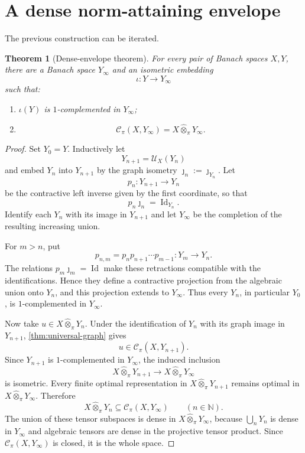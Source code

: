 \documentclass[11pt]{article}
\newtheorem{theorem}{Theorem}[section]
\theoremstyle{definition}
\theoremstyle{remark}
\newcommand{\N}{\mathbb N}
\newcommand{\whot}{\widehat\otimes_\pi}
\newcommand{\id}{\operatorname{Id}}
\newcommand{\Cpi}{\mathscr C_\pi}
\newcommand{\U}{\mathcal U}
\begin{document}
\section{A dense norm-attaining envelope}

The previous construction can be iterated.

\begin{theorem}[Dense-envelope theorem]\label{thm:envelope}
For every pair of Banach spaces $X,Y$, there are a Banach space $Y_\infty$ and an isometric embedding
\[
 \iota:Y\longrightarrow Y_\infty
\]
such that:
\begin{enumerate}[label=\textup{(\roman*)}]
\item $\iota(Y)$ is $1$-complemented in $Y_\infty$;
\item
\[
 \Cpi(X,Y_\infty)=X\whot Y_\infty.
\]
\end{enumerate}
\end{theorem}

\begin{proof}
Set $Y_0=Y$.  Inductively let
\[
 Y_{n+1}=\U_X(Y_n)
\]
and embed $Y_n$ into $Y_{n+1}$ by the graph isometry $\jmath_n:=\jmath_{Y_n}$.  Let
\[
 p_n:Y_{n+1}\longrightarrow Y_n
\]
be the contractive left inverse given by the first coordinate, so that
\[
 p_n\jmath_n=\id_{Y_n}.
\]
Identify each $Y_n$ with its image in $Y_{n+1}$ and let $Y_\infty$ be the completion of the resulting increasing union.

For $m>n$, put
\[
 p_{n,m}=p_n p_{n+1}\cdots p_{m-1}:Y_m\to Y_n.
\]
The relations $p_m\jmath_m=\id$ make these retractions compatible with the identifications.  Hence they define a contractive projection from the algebraic union onto $Y_n$, and this projection extends to $Y_\infty$.  Thus every $Y_n$, in particular $Y_0$, is $1$-complemented in $Y_\infty$.

Now take $u\in X\whot Y_n$.  Under the identification of $Y_n$ with its graph image in $Y_{n+1}$, \cref{thm:universal-graph} gives
\[
 u\in\Cpi(X,Y_{n+1}).
\]
Since $Y_{n+1}$ is $1$-complemented in $Y_\infty$, the induced inclusion
\[
 X\whot Y_{n+1}\longrightarrow X\whot Y_\infty
\]
is isometric.  Every finite optimal representation in $X\whot Y_{n+1}$ remains optimal in $X\whot Y_\infty$.  Therefore
\[
 X\whot Y_n\subseteq\Cpi(X,Y_\infty)
\qquad(n\in\N).
\]
The union of these tensor subspaces is dense in $X\whot Y_\infty$, because $\bigcup_nY_n$ is dense in $Y_\infty$ and algebraic tensors are dense in the projective tensor product.  Since $\Cpi(X,Y_\infty)$ is closed, it is the whole space.
\end{proof}
\end{document}
